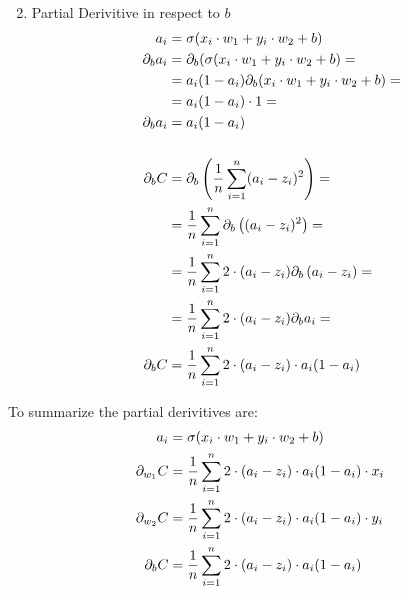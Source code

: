 \documentclass{article}
\begin{document}
\begin{enumerate}
{\begin{align}
        \end{align}
    }
    \item{
        Partial Derivitive in respect to $b$
        \begin{align}
            a_i  &= \sigma(x_i \cdot w_1 + y_i \cdot w_2 + b)  \\ 
            \pd[b]a_i &= \pd[b](\sigma(x_i \cdot w_1 + y_i \cdot w_2 + b) = \\ 
                      &= a_i(1 - a_i)\pd[b](x_i \cdot w_1 + y_i \cdot w_2 +b) = \\ 
                      &= a_i(1 - a_i) \cdot 1 = \\ 
            \pd[b]a_i &= a_i(1 - a_i) \\ 
            \\
            \pd[b]C &=\pd[b]\left(\avgsum[i, n](a_i - z_i)^2\right) =  \\ 
                    &=\avgsum[i, n]\pd[b]\left((a_i - z_i)^2\right) =  \\ 
                    &=\avgsum[i, n]2 \cdot (a_i - z_i)\pd[b]\left(a_i - z_i\right) = \\ 
                    &=\avgsum[i, n]2 \cdot (a_i - z_i)\pd[b]a_i = \\ 
            \pd[b]C &=\avgsum[i, n]2 \cdot (a_i - z_i) \cdot a_i(1 - a_i) \\ 
        \end{align}
    }
\end{enumerate}
To summarize the partial derivitives are:
\begin{align}
    a_i  &= \sigma(x_i \cdot w_1 + y_i \cdot w_2 + b) \\ 
    \pd[w_1]C &=\avgsum[i, n]2 \cdot (a_i - z_i) \cdot a_i(1 - a_i) \cdot x_i \\ 
    \pd[w_2]C &=\avgsum[i, n]2 \cdot (a_i - z_i) \cdot a_i(1 - a_i) \cdot y_i \\ 
    \pd[b]C   &=\avgsum[i, n]2 \cdot (a_i - z_i) \cdot a_i(1 - a_i) \\ 
\end{align}
\newpage
\end{document}
